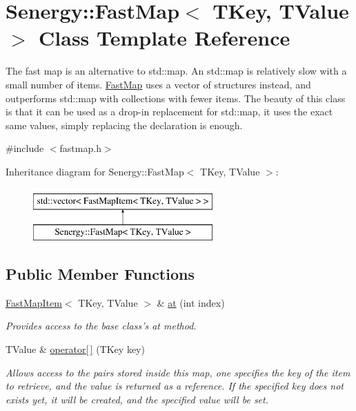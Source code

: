 \hypertarget{class_senergy_1_1_fast_map}{\section{Senergy\-:\-:Fast\-Map$<$ T\-Key, T\-Value $>$ Class Template Reference}
\label{class_senergy_1_1_fast_map}
}


The fast map is an alternative to std\-::map. An std\-::map is relatively slow with a small number of items. \hyperlink{class_senergy_1_1_fast_map}{Fast\-Map} uses a vector of structures instead, and outperforms std\-::map with collections with fewer items. The beauty of this class is that it can be used as a drop-\/in replacement for std\-::map, it uses the exact same values, simply replacing the declaration is enough.  




{\ttfamily \#include $<$fastmap.\-h$>$}

Inheritance diagram for Senergy\-:\-:Fast\-Map$<$ T\-Key, T\-Value $>$\-:\begin{figure}[H]
\begin{center}
\leavevmode
\includegraphics[height=2.000000cm]{class_senergy_1_1_fast_map}
\end{center}
\end{figure}
\subsection*{Public Member Functions}
\begin{DoxyCompactItemize}
\item 
\hyperlink{struct_senergy_1_1_fast_map_item}{Fast\-Map\-Item}$<$ T\-Key, T\-Value $>$ \& \hyperlink{class_senergy_1_1_fast_map_a869e057da1eeb6d54f510e1302a8b7a1}{at} (int index)
\begin{DoxyCompactList}\small\item\em Provides access to the base class's at method. \end{DoxyCompactList}\item 
T\-Value \& \hyperlink{class_senergy_1_1_fast_map_ac06929fda5af594e6ccf96198eac1819}{operator\mbox{[}$\,$\mbox{]}} (T\-Key key)
\begin{DoxyCompactList}\small\item\em Allows access to the pairs stored inside this map, one specifies the key of the item to retrieve, and the value is returned as a reference. If the specified key does not exists yet, it will be created, and the specified value will be set. \end{DoxyCompactList}\end{DoxyCompactItemize}


